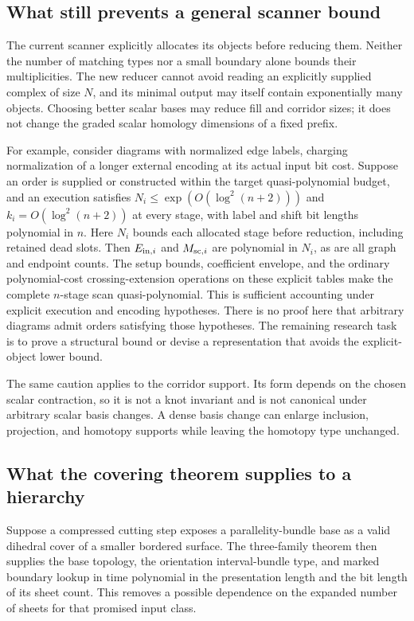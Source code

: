 \subsection{What still prevents a general scanner bound}

The current scanner explicitly allocates its objects before reducing
them. Neither the number of matching types nor a small boundary
alone bounds their multiplicities. The new reducer cannot avoid
reading an explicitly supplied complex of size $N$, and its minimal
output may itself contain exponentially many objects. Choosing better
scalar bases may reduce fill and corridor sizes; it does not change
the graded scalar homology dimensions of a fixed prefix.

For example, consider diagrams with normalized edge labels, charging
normalization of a longer external encoding at its actual input
bit cost. Suppose an order is supplied or constructed within the
target quasi-polynomial budget, and an execution satisfies
$N_i\leq\exp(O(\log^2(n+2)))$ and
$k_i=O(\log^2(n+2))$ at every stage, with label and shift bit lengths
polynomial in $n$. Here $N_i$ bounds each allocated stage before
reduction, including retained dead slots. Then $E_{{\rm in},i}$ and
$M_{{\rm sc},i}$ are polynomial in $N_i$, as are all graph and
endpoint counts. The setup bounds, coefficient envelope, and the
ordinary polynomial-cost crossing-extension operations on these
explicit tables make the complete $n$-stage scan quasi-polynomial.
This is sufficient accounting under explicit execution and
encoding hypotheses. There is no proof here that arbitrary diagrams
admit orders satisfying those hypotheses. The remaining research task
is to prove a structural bound or devise a representation that avoids
the explicit-object lower bound.

The same caution applies to the corridor support. Its form depends
on the chosen scalar contraction, so it is not a knot invariant and
is not canonical under arbitrary scalar basis changes. A dense basis
change can enlarge inclusion, projection, and homotopy supports while
leaving the homotopy type unchanged.

\subsection{What the covering theorem supplies to a hierarchy}

Suppose a compressed cutting step exposes a parallelity-bundle base
as a valid dihedral cover of a smaller bordered surface. The
three-family theorem then supplies the base topology, the orientation
interval-bundle type, and marked boundary lookup in time polynomial
in the presentation length and the bit length of its sheet count.
This removes a possible dependence on the expanded number of sheets
for that promised input class.

